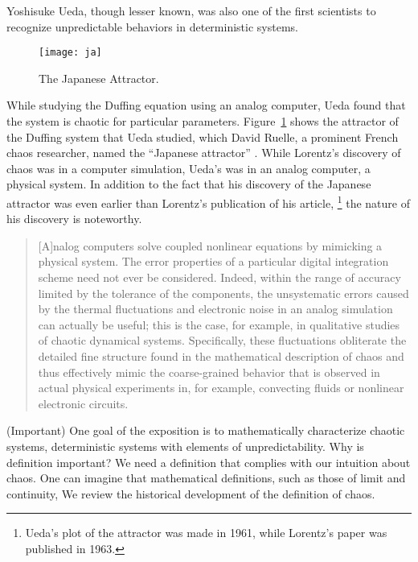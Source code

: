 \documentclass[10pt,twoside]{book}
\begin{document}
Yoshisuke Ueda, though lesser known, was also one of the first scientists to recognize unpredictable behaviors in deterministic systems.
\begin{figure}[ht]
  \centering
  \texttt{[image: ja]}
  \caption{The Japanese Attractor.}
  \label{fig:ja}
\end{figure}
While studying the Duffing equation using an analog computer, Ueda found that the system is chaotic for particular parameters.
Figure~\ref{fig:ja} shows the attractor of the Duffing system that Ueda studied, which David Ruelle, a prominent French chaos researcher, named the ``Japanese attractor'' \citep{ruelle}.
While Lorentz's discovery of chaos was in a computer simulation, Ueda's was in an analog computer, a physical system.
In addition to the fact that his discovery of the Japanese attractor was even earlier than Lorentz's publication of his article,
\footnote{Ueda's plot of the attractor was made in 1961, while Lorentz's paper was published in 1963.}
the nature of his discovery is noteworthy.
\begin{quotation}
  [A]nalog computers solve coupled nonlinear equations by mimicking a physical system.
  The error properties of a particular digital integration scheme need not ever be considered.
  Indeed, within the range of accuracy limited by the tolerance of the components, the unsystematic errors caused by the thermal fluctuations and electronic noise in an analog simulation can actually be useful; this is the case, for example, in qualitative studies of chaotic dynamical systems.
  Specifically, these fluctuations obliterate the detailed fine structure found in the mathematical description of chaos and thus effectively mimic the coarse-grained behavior that is observed in actual physical experiments in, for example, convecting fluids or nonlinear electronic circuits.
  \citep[p.383]{campbell}
\end{quotation}


(Important)
One goal of the exposition is to mathematically characterize chaotic systems, deterministic systems with elements of unpredictability.
Why is definition important?
We need a definition that complies with our intuition about chaos.
One can imagine that mathematical definitions, such as those of limit and continuity,
We review the historical development of the definition of chaos.
\end{document}
